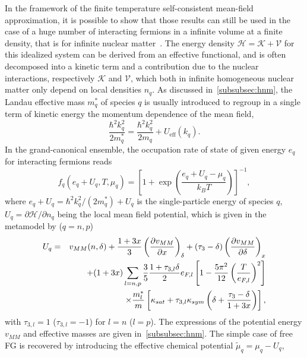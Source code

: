 In the framework of the finite temperature self-consistent mean-field
approximation, it is possible to show that those results can still be used in 
the case of a huge number of interacting fermions in a infinite volume at a 
finite density, that is for infinite nuclear matter~\cite{Vautherin1996}. 
The energy density $\mathcal{H} = \mathcal{K} + \mathcal{V}$ for this 
idealized system can be derived from an
effective functional, and is often decomposed into a kinetic term and a 
contribution due to the nuclear interactions, respectively $\mathcal{K}$ and 
$\mathcal{V}$, which both in infinite homogeneous nuclear matter only depend on
local densities $n_q$.
As discussed in~\ref{subsubsec:hnm}, the Landau effective mass $m_q^*$ of 
species $q$ is usually introduced to regroup in a single term of kinetic 
energy the momentum dependence of the mean field,
%
\begin{equation}
  \frac{\hbar^2 k_q^2}{2m_q^*} = \frac{\hbar^2 k_q^2}{2m_q} +
  U_{\text{eff}}(k_q).
\end{equation}
%
In the grand-canonical ensemble, the occupation rate of state of given energy
$e_q$ for interacting fermions reads
%
\begin{equation}
  f_q(e_q+U_q, T, \mu_q) 
  = \left[1+\exp\left(\frac{e_q + U_q - \mu_q}{k_B T}\right)\right]^{-1},
\end{equation}
%
where $e_q + U_q = \hbar^2 k_q^2/(2m_q^*) + U_q$ is the single-particle energy
of species $q$, $U_q = \partial\mathcal{H}/\partial n_q$ being the local mean
field potential, which is given in the metamodel by ($q=n,p$)
%
\begin{eqnarray}
  U_q &=& v_{MM}(n,\delta) + \frac{1+3x}{3}\left(\frac{\partial
  v_{MM}}{\partial x}\right)_{\delta}
  + (\tau_3 - \delta) 
  \left(\frac{\partial v_{MM}}{\partial \delta}\right)_x\notag\\
      &&+ (1+3x)\sum_{l=n,p}\frac{3}{5}\frac{1+\tau_{3,l}\delta}{2}
      e_{F,l}\left[1-\frac{5\pi^2}{12}\left(\frac{T}{e_{F,l}}\right)^2\right]
      \notag\\
      &&\times \frac{m_l^*}{m} \left[
        \kappa_{sat}+\tau_{3,l} \kappa_{sym} \left(\delta
        + \frac{\tau_3-\delta}{1+3x}\right)
    \right],
\end{eqnarray}
%
with $\tau_{3,l} = 1$ ($\tau_{3,l} = -1$) for $l=n$ ($l=p$). The expressions of
the potential energy $v_{MM}$ and effective masses are given 
in~\ref{subsubsec:hnm}. The simple case of free FG is recovered by 
introducing the effective chemical potential $\tilde{\mu}_q = \mu_q - U_q$,
